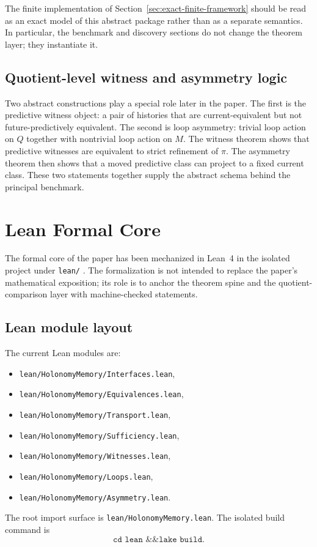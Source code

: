 \documentclass[11pt]{article}
\newcommand{\CurrentQ}{Q}
\newcommand{\PredictiveQ}{M}
\theoremstyle{definition}
\begin{document}
The finite implementation of Section~\ref{sec:exact-finite-framework} should be read as an exact model of this abstract package rather than as a separate semantics. In particular, the benchmark and discovery sections do not change the theorem layer; they instantiate it.

\subsection{Quotient-level witness and asymmetry logic}\label{appsubsec:proof-witness-asymmetry}
Two abstract constructions play a special role later in the paper. The first is the predictive witness object: a pair of histories that are current-equivalent but not future-predictively equivalent. The second is loop asymmetry: trivial loop action on $\CurrentQ$ together with nontrivial loop action on $\PredictiveQ$. The witness theorem shows that predictive witnesses are equivalent to strict refinement of $\pi$. The asymmetry theorem then shows that a moved predictive class can project to a fixed current class. These two statements together supply the abstract schema behind the principal benchmark.

\section{Lean Formal Core}\label{app:lean-core}
The formal core of the paper has been mechanized in Lean~4 in the isolated project under \texttt{lean/} \citep{deMouraUllrich2021Lean4}. The formalization is not intended to replace the paper’s mathematical exposition; its role is to anchor the theorem spine and the quotient-comparison layer with machine-checked statements.

\subsection{Lean module layout}\label{appsubsec:lean-layout}
The current Lean modules are:
\begin{itemize}
\item \texttt{lean/HolonomyMemory/Interfaces.lean},
\item \texttt{lean/HolonomyMemory/Equivalences.lean},
\item \texttt{lean/HolonomyMemory/Transport.lean},
\item \texttt{lean/HolonomyMemory/Sufficiency.lean},
\item \texttt{lean/HolonomyMemory/Witnesses.lean},
\item \texttt{lean/HolonomyMemory/Loops.lean},
\item \texttt{lean/HolonomyMemory/Asymmetry.lean}.
\end{itemize}
The root import surface is \texttt{lean/HolonomyMemory.lean}. The isolated build command is
\[
\texttt{cd lean \&\& lake build}.
\]
\end{document}
